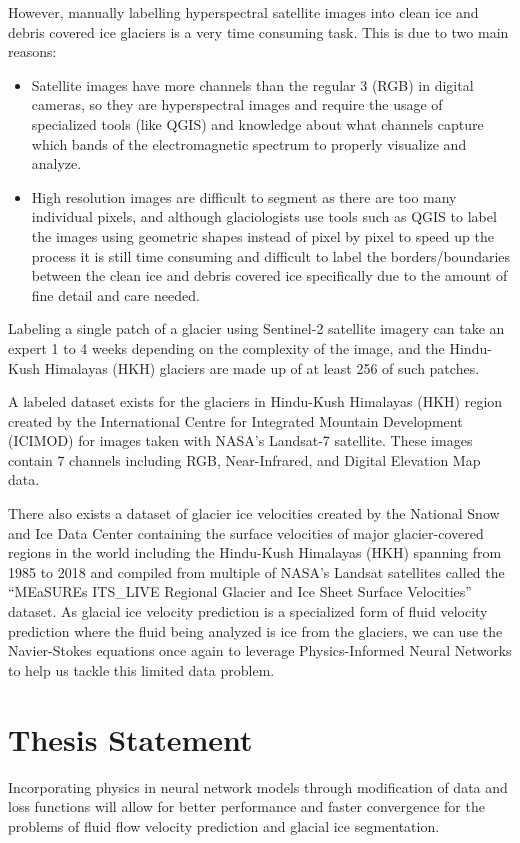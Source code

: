 However, manually labelling hyperspectral satellite images into clean ice and debris covered ice glaciers is a very time consuming task. This is due to two main reasons:

\begin{itemize}
    \item Satellite images have more channels than the regular 3 (RGB) in digital cameras, so they are hyperspectral images and require the usage of specialized tools (like QGIS) and knowledge about what channels capture which bands of the electromagnetic spectrum to properly visualize and analyze.
    \item High resolution images are difficult to segment as there are too many individual pixels, and although glaciologists use tools such as QGIS to label the images using geometric shapes instead of pixel by pixel to speed up the process it is still time consuming and difficult to label the borders/boundaries between the clean ice and debris covered ice specifically due to the amount of fine detail and care needed.
\end{itemize}

Labeling a single patch of a glacier using Sentinel-2 satellite imagery can take an expert 1 to 4 weeks depending on the complexity of the image, and the Hindu-Kush Himalayas (HKH) glaciers are made up of at least 256 of such patches.

A labeled dataset exists for the glaciers in Hindu-Kush Himalayas (HKH) region created by the International Centre for Integrated Mountain Development (ICIMOD) for images taken with NASA's Landsat-7 satellite. These images contain 7 channels including RGB, Near-Infrared, and Digital Elevation Map data. 

There also exists a dataset of glacier ice velocities created by the National Snow and Ice Data Center containing the surface velocities of major glacier-covered regions in the world including the Hindu-Kush Himalayas (HKH) spanning from 1985 to 2018 and compiled from multiple of NASA's Landsat satellites called the ``MEaSUREs ITS\_LIVE Regional Glacier and Ice Sheet Surface Velocities'' dataset. As glacial ice velocity prediction is a specialized form of fluid velocity prediction where the fluid being analyzed is ice from the glaciers, we can use the Navier-Stokes equations once again to leverage Physics-Informed Neural Networks \cite{PINNS} to help us tackle this limited data problem.

\section{Thesis Statement}
Incorporating physics in neural network models through modification of data and loss functions will allow for better performance and faster convergence for the problems of fluid flow velocity prediction and glacial ice segmentation.

